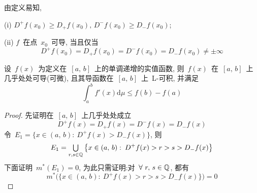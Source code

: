 由定义易知,

(i) $D^+f(x_0) \geqslant D_+f(x_0), \, D^-f(x_0) \geqslant D_-f(x_0)$;

(ii) $f$~在点~$x_0$~可导, 当且仅当
\[
D^+f(x_0) = D_+f(x_0) = D^-f(x_0) = D_-f(x_0) \neq \pm \infty
\]

\begin{theorem} \label{thm513}
设~$f(x)$~为定义在~$[a,\,b]$~上的单调递增的实值函数, 则~$f(x)$~在~$[a,\,b]$~上几乎处处可导(可微), 且其导函数在~$[a,\,b]$~上~L-可积, 并满足
\begin{equation} \label{eq510}
\int_a^b f'(x) \mathrm{d} \mu \leqslant f(b) - f(a)
\end{equation}
\end{theorem}

\begin{proof}
先证明在~$[a,\,b]$~上几乎处处成立
\begin{equation} \label{eq513}
D^+f(x) = D_+f(x) = D^-f(x) = D_-f(x)
\end{equation}
令~$E_1 = \big\{x \in (a,\,b):\: D^+f(x) > D_-f(x)\big\}$, 则
\[
E_1 = \mathop{\textstyle{\bigcup}}_{r,s \in \mathbb{Q}} \big\{x \in (a,\,b):\: D^+f(x) > r > s >  D_-f(x)\big\}
\]
下面证明~$m^*(E_1) = 0$, 为此只需证明:对~$\forall~r,\,s \in \mathbb{Q}$, 都有
\[
m^*\big( \{x \in (a,\,b):\: D^+f(x) > r > s >  D_-f(x)\} \big) = 0
\]


\end{proof}

